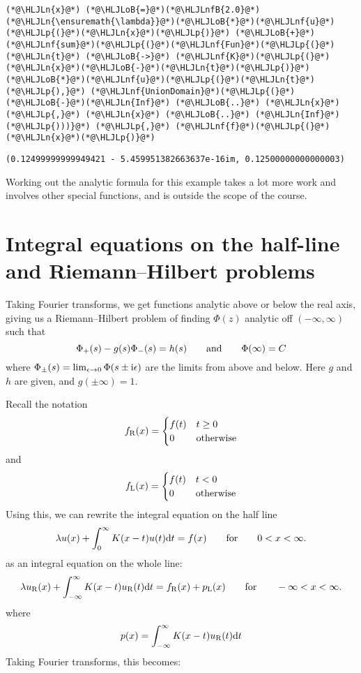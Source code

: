 \documentclass[12pt,landscape]{article}
\newcommand{\HLJLn}[1]{#1}
\newcommand{\HLJLnf}[1]{\textcolor[RGB]{66,102,213}{#1}}
\newcommand{\HLJLnfB}[1]{\textcolor[RGB]{59,151,46}{#1}}
\newcommand{\HLJLoB}[1]{\textcolor[RGB]{102,102,102}{\textbf{#1}}}
\newcommand{\HLJLp}[1]{#1}
\def\qqand{\qquad\hbox{and}\qquad}
\def\qqfor{\qquad\hbox{for}\qquad}
\def\D{ {\rm d} }
\def\I{ {\rm i} }
\def\dt{\D t}
\def\endash{–}
\begin{document}
{\begin{lstlisting}
(*@\HLJLn{x}@*) (*@\HLJLoB{=}@*)(*@\HLJLnfB{2.0}@*)
(*@\HLJLn{\ensuremath{\lambda}}@*)(*@\HLJLoB{*}@*)(*@\HLJLnf{u}@*)(*@\HLJLp{(}@*)(*@\HLJLn{x}@*)(*@\HLJLp{)}@*) (*@\HLJLoB{+}@*)  (*@\HLJLnf{sum}@*)(*@\HLJLp{(}@*)(*@\HLJLnf{Fun}@*)(*@\HLJLp{(}@*)(*@\HLJLn{t}@*) (*@\HLJLoB{->}@*) (*@\HLJLnf{K}@*)(*@\HLJLp{(}@*)(*@\HLJLn{x}@*)(*@\HLJLoB{-}@*)(*@\HLJLn{t}@*)(*@\HLJLp{)}@*)(*@\HLJLoB{*}@*)(*@\HLJLnf{u}@*)(*@\HLJLp{(}@*)(*@\HLJLn{t}@*)(*@\HLJLp{),}@*) (*@\HLJLnf{UnionDomain}@*)(*@\HLJLp{(}@*)(*@\HLJLoB{-}@*)(*@\HLJLn{Inf}@*) (*@\HLJLoB{..}@*) (*@\HLJLn{x}@*)(*@\HLJLp{,}@*) (*@\HLJLn{x}@*) (*@\HLJLoB{..}@*) (*@\HLJLn{Inf}@*)(*@\HLJLp{)))}@*) (*@\HLJLp{,}@*) (*@\HLJLnf{f}@*)(*@\HLJLp{(}@*)(*@\HLJLn{x}@*)(*@\HLJLp{)}@*)
\end{lstlisting}

\begin{lstlisting}
(0.12499999999949421 - 5.459951382663637e-16im, 0.12500000000000003)
\end{lstlisting}


Working out the analytic formula for this example takes a lot more work and involves other special functions, and is outside the scope of the course.
\newpage
\section{Integral equations on the half-line and Riemann\ensuremath{\endash}Hilbert problems}
Taking Fourier transforms, we get functions analytic above or below the real axis, giving us a Riemann\ensuremath{\endash}Hilbert problem of finding $\Phi(z)$ analytic off $(-\infty,\infty)$ such that
\[
\Phi_+(s) - g(s)\Phi_-(s) = h(s) \qqand \Phi(\infty) = C
\]
where $\Phi_\pm(s) = \lim_{\epsilon \rightarrow 0} \Phi(s \pm \I \epsilon)$ are the limits from above and below.  Here $g$ and $h$ are given, and $g(\pm \infty) = 1$.

Recall the notation
\[
f_{\rm R}(x) = \begin{cases}f(t) & t \geq 0 \\ 0 & \hbox{otherwise} \end{cases}
\]
and
\[
f_{\rm L}(x) = \begin{cases}f(t) & t < 0 \\ 0 & \hbox{otherwise} \end{cases}
\]
Using this, we can rewrite the integral equation on the half line
\[
\lambda u(x) + \int_{0}^\infty K(x-t)u(t) \dt = f(x)\qqfor 0 < x < \infty.
\]
as an integral equation on the whole line:
\[
\lambda u_{\rm R}(x) + \int_{-\infty}^\infty K(x-t)u_{\rm R}(t) \dt = f_{\rm R}(x) + p_{\rm L}(x)\qqfor -\infty < x < \infty.
\]
where
\[
p(x) = \int_{-\infty}^\infty K(x-t)u_{\rm R}(t) \dt
\]
Taking Fourier transforms, this becomes:

}
\end{document}
